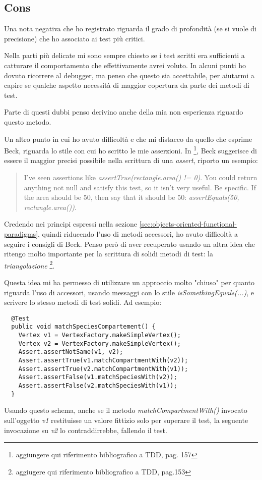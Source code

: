 \subsection{Cons}
Una nota negativa che ho registrato riguarda il grado di profondit\`a
(se si vuole di precisione) che ho associato ai test pi\`u critici.

Nella parti pi\`u delicate mi sono sempre chiesto se i test scritti
era sufficienti a catturare il comportamento che effettivamente avrei
voluto. In alcuni punti ho dovuto ricorrere al debugger, ma penso che
questo sia accettabile, per aiutarmi a capire se qualche aspetto
necessit\`a di maggior copertura da parte dei metodi di test.

Parte di questi dubbi penso derivino anche della mia non esperienza
riguardo questo metodo.

Un altro punto in cui ho avuto difficolt\`a e che mi distacco da
quello che esprime Beck, riguarda lo stile con cui ho scritto le mie
asserzioni. In \footnote{aggiungere qui riferimento bibliografico a
  TDD, pag. 157}, Beck suggerisce di essere il maggior precisi
possibile nella scrittura di una \emph{assert}, riporto un esempio:
\begin{quotation}
  I've seen assertions like \emph{assertTrue(rectangle.area() !=
    0)}. You could return anything not null and satisfy this test, so
  it isn't very useful. Be specific. If the area should be 50, then
  say that it should be 50: \emph{assertEquals(50, rectangle.area())}.
\end{quotation}
Credendo nei principi espressi nella sezione
\ref{sec:objects-oriented-functional-paradigms}, quindi riducendo
l'uso di metodi accessori, ho avuto difficolt\`a a seguire i consigli
di Beck. Penso per\`o di aver recuperato usando un altra idea che
ritengo molto importante per la scrittura di solidi metodi di test: la
\emph{triangolazione} \footnote{aggiugere qui riferimento
  bibliografico a TDD, pag.153}. 

Questa idea mi ha permesso di utilizzare un approccio molto "chiuso"
per quanto riguarda l'uso di accessori, usando messaggi con lo
stile \emph{isSomethingEquals(...)}, e scrivere lo stesso metodi di
test solidi. Ad esempio:
\begin{lstlisting}
  @Test
  public void matchSpeciesCompartement() {
    Vertex v1 = VertexFactory.makeSimpleVertex();
    Vertex v2 = VertexFactory.makeSimpleVertex();
    Assert.assertNotSame(v1, v2);
    Assert.assertTrue(v1.matchCompartmentWith(v2));
    Assert.assertTrue(v2.matchCompartmentWith(v1));
    Assert.assertFalse(v1.matchSpeciesWith(v2));
    Assert.assertFalse(v2.matchSpeciesWith(v1));
  }
\end{lstlisting}
Usando questo schema, anche se il metodo \emph{matchCompartmentWith()}
invocato sull'oggetto \emph{v1} restituisse un valore fittizio solo
per superare il test, la seguente invocazione su \emph{v2} lo
contraddirrebbe, fallendo il test.
